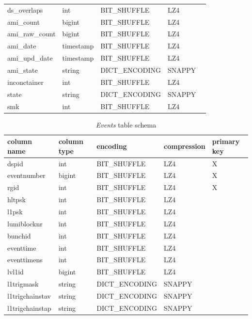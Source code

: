 \documentclass{webofc}
\begin{document}
\begin{linenumbers}
\begin{table}
\begin{tabular}{lllll}
ds\_overlaps      & int             & BIT\_SHUFFLE    & LZ4 &   \\
ami\_count        & bigint          & BIT\_SHUFFLE    & LZ4 &   \\
ami\_raw_count    & bigint          & BIT\_SHUFFLE    & LZ4 &   \\
ami\_date         & timestamp       & BIT\_SHUFFLE    & LZ4 &   \\  
ami\_upd_date     & timestamp       & BIT\_SHUFFLE    & LZ4 &   \\
ami\_state        & string          & DICT\_ENCODING  & SNAPPY &\\
inconctainer     & int             & BIT\_SHUFFLE    & LZ4 &   \\  
state            & string          & DICT\_ENCODING  & SNAPPY &\\
smk              & int             & BIT\_SHUFFLE    & LZ4 &   \\\hline
\end{tabular}
\end{table}
\begin{table}
\centering
\caption{\textit{Events} table schema}
\label{tab-2}
\begin{tabular}{lllll}
\hline
column name & column type & encoding & compression & primary key  \\\hline
dspid           & int        & BIT\_SHUFFLE   & LZ4 & X   \\
eventnumber     & bigint     & BIT\_SHUFFLE   & LZ4 & X   \\
rgid            & int        & BIT\_SHUFFLE   & LZ4 & X   \\
hltpsk          & int        & BIT\_SHUFFLE   & LZ4 &     \\
l1psk           & int        & BIT\_SHUFFLE   & LZ4 &     \\
lumiblocknr     & int        & BIT\_SHUFFLE   & LZ4 &     \\
bunchid         & int        & BIT\_SHUFFLE   & LZ4 &     \\
eventtime       & int        & BIT\_SHUFFLE   & LZ4 &     \\
eventtimens     & int        & BIT\_SHUFFLE   & LZ4 &     \\
lvl1id          & bigint     & BIT\_SHUFFLE   & LZ4 &     \\
l1trigmask      & string     & DICT\_ENCODING & SNAPPY &  \\
l1trigchainstav & string     & DICT\_ENCODING & SNAPPY &  \\
l1trigchainstap & string     & DICT\_ENCODING & SNAPPY &  \\

\end{tabular}
\end{table}
\end{linenumbers}
\end{document}

